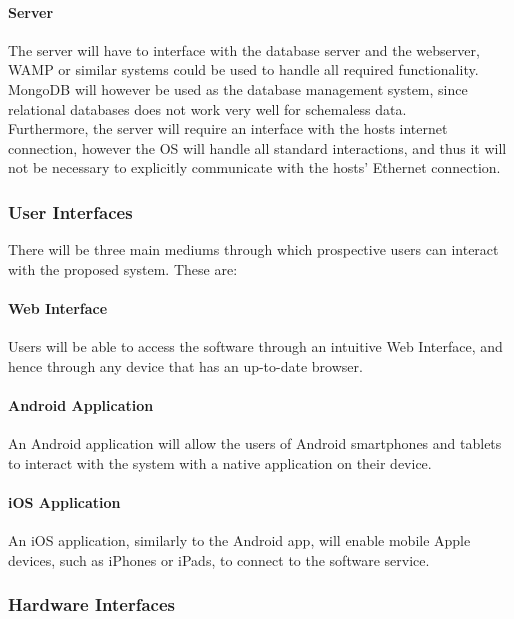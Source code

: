 \documentclass[12pt,a4paper]{article}
\begin{document}
				\paragraph{Server}
				
					The server will have to interface with the database server and the webserver, WAMP or 
					similar systems could be used to handle all required functionality. MongoDB will however 
					be used as the database management system, since relational databases does not work very 
					well for schemaless data. \\
					Furthermore, the server will require an interface with the hosts 
					internet connection, however the OS will handle all standard interactions, and thus it will 
					not be necessary to explicitly communicate with the hosts' Ethernet connection.

			\subsubsection{User Interfaces}

				There will be three main mediums through which prospective users can
				interact with the proposed system. These are:

				\paragraph{Web Interface}

					Users will be able to access the software through an intuitive Web
					Interface, and hence through any device that has an up-to-date browser.

				\paragraph{Android Application}

					An Android application will allow the users of Android smartphones
					and tablets to interact with the system with a native application on
					their device.

				\paragraph{iOS Application}

					An iOS application, similarly to the Android app, will enable mobile
					Apple devices, such as iPhones or iPads, to connect to the software
					service.

			\subsubsection{Hardware Interfaces}
\end{document}
